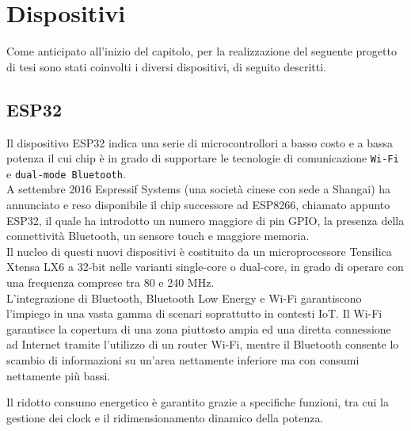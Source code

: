 \section{Dispositivi}
Come anticipato all'inizio del capitolo, per la realizzazione del seguente progetto di tesi sono stati coinvolti i diversi dispositivi, di seguito descritti.
\subsection{ESP32}
Il dispositivo ESP32 \cite{esp322019} indica una serie di microcontrollori a basso costo e a bassa potenza il cui chip è in grado di supportare le tecnologie di comunicazione \texttt{Wi-Fi} e \texttt{dual-mode Bluetooth}. \\
A settembre 2016 Espressif Systems (una società cinese con sede a Shangai) ha annunciato e reso disponibile il chip successore ad ESP8266, chiamato appunto ESP32, il quale ha introdotto un numero maggiore di pin GPIO, la presenza della connettività Bluetooth, un sensore touch e maggiore memoria.\\ 
Il nucleo di questi nuovi dispositivi è costituito da un microprocessore Tensilica Xtensa LX6 a 32-bit nelle varianti single-core o dual-core, in grado di operare con una frequenza comprese tra 80 e 240 MHz.\\
L'integrazione di Bluetooth, Bluetooth Low Energy e Wi-Fi garantiscono l'impiego in una vasta gamma di scenari soprattutto in contesti IoT. Il Wi-Fi garantisce la copertura di una zona piuttosto ampia ed una diretta connessione ad Internet tramite l'utilizzo di un router Wi-Fi, mentre il Bluetooth consente lo scambio di informazioni su un'area nettamente inferiore ma con consumi nettamente più bassi.

Il ridotto consumo energetico è garantito grazie a specifiche funzioni, tra cui la gestione dei clock e il ridimensionamento dinamico della potenza.\\

